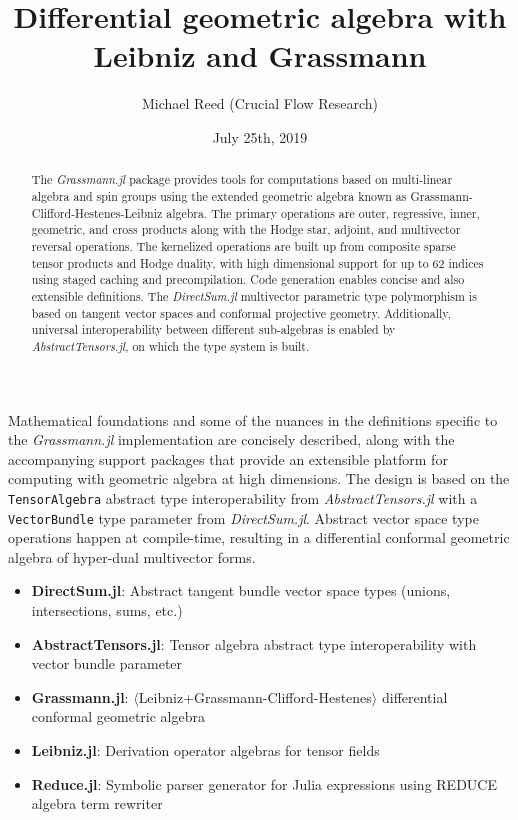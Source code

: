 \documentclass{juliacon}
\author{Michael Reed (Crucial Flow Research)}
\title{Differential geometric algebra with Leibniz and Grassmann}
\date{July 25th, 2019}
\begin{document}
%

\maketitle

\begin{abstract}
	The \textit{Grassmann.jl}
	package provides tools for computations based on multi-linear algebra and spin groups using the extended geometric algebra known as Grassmann-Clifford-Hestenes-Leibniz algebra.
	The primary operations are
	outer, regressive, inner, geometric, and cross products along with the Hodge star, adjoint, and multivector reversal operations. 
	The kernelized operations are built up from composite sparse tensor products and Hodge duality, with high dimensional support for up to 62 indices using staged caching and precompilation. Code generation enables concise and also extensible definitions.
	The \textit{DirectSum.jl}
	multivector parametric type polymorphism is based on tangent vector spaces and conformal projective geometry.
	Additionally, universal interoperability between different sub-algebras is enabled by \textit{AbstractTensors.jl},
	on which the type system is built.
\end{abstract}

Mathematical foundations and some of the nuances in the definitions specific to the \textit{Grassmann.jl} implementation are concisely described, along with the accompanying support packages that provide an extensible platform for computing with geometric algebra at high dimensions.
The design is based on the \verb`TensorAlgebra` abstract type interoperability from \textit{AbstractTensors.jl} with a \verb`VectorBundle` type parameter from \textit{DirectSum.jl}. Abstract vector space type operations happen at compile-time, resulting in a differential conformal geometric algebra of hyper-dual multivector forms.

\begin{itemize}
	\item \textbf{DirectSum.jl}: Abstract tangent bundle vector space types (unions, intersections, sums, etc.)
	\item \textbf{AbstractTensors.jl}: Tensor algebra abstract type interoperability with vector bundle parameter	
	\item \textbf{Grassmann.jl}: $\langle$Leibniz+Grassmann-Clifford-Hestenes$\rangle$ differential conformal geometric algebra
	\item \textbf{Leibniz.jl}: Derivation operator algebras for tensor fields
	\item \textbf{Reduce.jl}: Symbolic parser generator for Julia expressions using REDUCE algebra term rewriter
\end{itemize}
\end{document}

